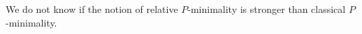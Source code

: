 We do not know if the notion of relative $P$-minimality is stronger than classical $P$-minimality. 


%
%
%
%
%
%
%
%
%






